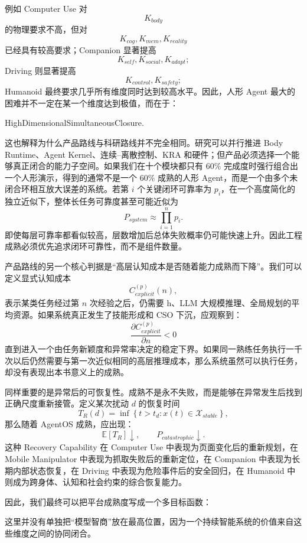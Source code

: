 例如 Computer Use 对
\[
K_{body}
\]
的物理要求不高，但对
\[
K_{cog},K_{mem},K_{reality}
\]
已经具有较高要求；Companion 显著提高
\[
K_{self},K_{social},K_{adapt};
\]
Driving 则显著提高
\[
K_{control},K_{safety};
\]
Humanoid 最终要求几乎所有维度同时达到较高水平。因此，人形 Agent 最大的困难并不一定在某一个维度达到极值，而在于：
\begin{statementbox}
HighDimensionalSimultaneousClosure.
\end{statementbox}

这也解释为什么产品路线与科研路线并不完全相同。研究可以并行推进 Body Runtime、Agent Kernel、连续--离散控制、KRA 和硬件；但产品必须选择一个能够真正闭合的能力子空间。如果我们在十个模块都只有 $60\%$ 完成度时强行组合出一个人形演示，得到的通常不是一个 $60\%$ 成熟的人形 Agent，而是一个由多个未闭合环相互放大误差的系统。若第 $i$ 个关键闭环可靠率为 $p_i$，在一个高度简化的独立近似下，整体长任务可靠度甚至可能近似为
\[
P_{system}
\approx
\prod_{i=1}^{n}p_i.
\]
即使每层可靠率都看似较高，层数增加后总体失败概率仍可能快速上升。因此工程成熟必须优先追求闭环可靠性，而不是组件数量。

产品路线的另一个核心判据是“高层认知成本是否随着能力成熟而下降”。我们可以定义显式认知成本
\[
C_{explicit}^{(p)}(n),
\]
表示某类任务经过第 $n$ 次经验之后，仍需要 h、LLM 大规模推理、全局规划的平均资源。如果系统真正发生了技能形成和 CSO 下沉，应观察到：
\[
\frac{\partial C_{explicit}^{(p)}}{\partial n}
<
0
\]
直到进入一个由任务新颖度和异常率决定的稳定下界。如果同一熟练任务执行一千次以后仍然需要与第一次近似相同的高层推理成本，那么系统虽然可以执行任务，却没有表现出本书意义上的成熟。

同样重要的是异常后的可恢复性。成熟不是永不失败，而是能够在异常发生后找到正确尺度重新接管。定义某次扰动 $d$ 的恢复时间
\[
T_R(d)
=
\inf
\left\{
t>t_d:
x(t)\in\mathcal{X}_{stable}
\right\},
\]
那么随着 AgentOS 成熟，应出现：
\[
\mathbb{E}[T_R]\downarrow,
\qquad
P_{catastrophic}\downarrow.
\]
这种 Recovery Capability 在 Computer Use 中表现为页面变化后的重新规划，在 Mobile Manipulator 中表现为抓取失败后的重新定位，在 Companion 中表现为长期内部状态恢复，在 Driving 中表现为危险事件后的安全回归，在 Humanoid 中则成为跨身体、认知和社会约束的综合恢复能力。

因此，我们最终可以把平台成熟度写成一个多目标函数：
\begin{statementbox}
\centering
{}
\end{statementbox}
这里并没有单独把“模型智商”放在最高位置，因为一个持续智能系统的价值来自这些维度之间的协同闭合。

